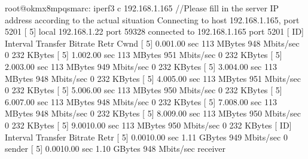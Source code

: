 \documentclass[letterpaper,10pt,openany,english]{sphinxmanual}
\begin{document}
\begin{sphinxVerbatim}[commandchars=\\\{\}]
root@ok\PYGZhy{}mx8mpq\PYGZhy{}smarc:\PYGZti{}\PYGZsh{} iperf3 \PYGZhy{}c 192.168.1.165       //Please fill in the server IP address according to the actual situation
Connecting to host 192.168.1.165, port 5201
[  5] local 192.168.1.22 port 59328 connected to 192.168.1.165 port 5201
[ ID] Interval           Transfer     Bitrate         Retr  Cwnd
[  5]   0.00\PYGZhy{}1.00   sec   113 MBytes   948 Mbits/sec    0    232 KBytes       
[  5]   1.00\PYGZhy{}2.00   sec   113 MBytes   951 Mbits/sec    0    232 KBytes
[  5]   2.00\PYGZhy{}3.00   sec   113 MBytes   949 Mbits/sec    0    232 KBytes       
[  5]   3.00\PYGZhy{}4.00   sec   113 MBytes   948 Mbits/sec    0    232 KBytes       
[  5]   4.00\PYGZhy{}5.00   sec   113 MBytes   951 Mbits/sec    0    232 KBytes       
[  5]   5.00\PYGZhy{}6.00   sec   113 MBytes   950 Mbits/sec    0    232 KBytes       
[  5]   6.00\PYGZhy{}7.00   sec   113 MBytes   948 Mbits/sec    0    232 KBytes       
[  5]   7.00\PYGZhy{}8.00   sec   113 MBytes   948 Mbits/sec    0    232 KBytes       
[  5]   8.00\PYGZhy{}9.00   sec   113 MBytes   950 Mbits/sec    0    232 KBytes
[  5]   9.00\PYGZhy{}10.00  sec   113 MBytes   950 Mbits/sec    0    232 KBytes       
\PYGZhy{} \PYGZhy{} \PYGZhy{} \PYGZhy{} \PYGZhy{} \PYGZhy{} \PYGZhy{} \PYGZhy{} \PYGZhy{} \PYGZhy{} \PYGZhy{} \PYGZhy{} \PYGZhy{} \PYGZhy{} \PYGZhy{} \PYGZhy{} \PYGZhy{} \PYGZhy{} \PYGZhy{} \PYGZhy{} \PYGZhy{} \PYGZhy{} \PYGZhy{} \PYGZhy{} \PYGZhy{}
[ ID] Interval           Transfer     Bitrate         Retr
[  5]   0.00\PYGZhy{}10.00  sec  1.11 GBytes   949 Mbits/sec    0             sender
[  5]   0.00\PYGZhy{}10.00  sec  1.10 GBytes   948 Mbits/sec                  receiver


\end{sphinxVerbatim}
\end{document}
